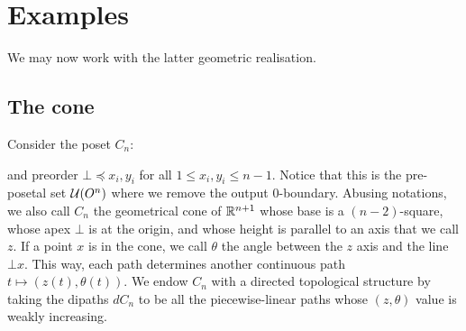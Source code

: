 \section{Examples}
We may now work with the latter geometric realisation.

\subsection{The cone}

Consider the poset \( C_n \):
\begin{center}
\end{center}
and preorder \( \bot \preceq x_i, y_i \) for all \( 1 \le x_i, y_i \le n-1 \). Notice that this is the pre-posetal set \( \mathcal{U}(O^n) \) where we remove the output 0-boundary. Abusing notations, we also call \( C_n \) the geometrical cone of \( \mathbb{R}^{n+1} \) whose base is a \( (n-2) \)-square, whose apex \( \bot \) is at the origin, and whose height is parallel to an axis that we call \( z \). If a point \( x \)  is in the cone, we call \( \theta \) the angle between the \( z \) axis and the line \( \bot x \). This way, each path determines another continuous path \( t \mapsto (z(t), \theta(t)) \).  We endow \( C_n \) with a directed topological structure by taking the dipaths \( dC_n \) to be all the piecewise-linear paths whose \( (z, \theta) \) value is weakly increasing.

